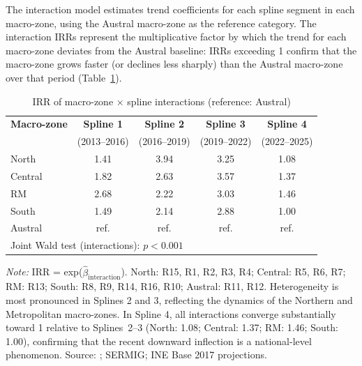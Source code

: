 \documentclass[pdflatex,sn-basic]{sn-jnl}
\newcommand{\tablenote}[1]{%
  \vspace{2pt}%
  {\par\footnotesize\textit{Note:} #1\par}%
}
\begin{document}
The interaction model estimates trend coefficients for each spline segment in each macro-zone, using the Austral macro-zone as the reference category. The interaction IRRs represent the multiplicative factor by which the trend for each macro-zone deviates from the Austral baseline: IRRs exceeding 1 confirm that the macro-zone grows faster (or declines less sharply) than the Austral macro-zone over that period (Table~\ref{tab:macro}).

\begin{table}[htbp]
\centering
\caption{IRR of macro-zone \texorpdfstring{$\times$}{x} spline interactions (reference: Austral)}
\label{tab:macro}
\small
\begin{tabular}{lcccc}
\toprule
\textbf{Macro-zone} & \textbf{Spline 1} & \textbf{Spline 2} & \textbf{Spline 3} & \textbf{Spline 4} \\
 & (2013--2016) & (2016--2019) & (2019--2022) & (2022--2025) \\
\midrule
North   & 1.41 & 3.94 & 3.25 & 1.08 \\
Central  & 1.82 & 2.63 & 3.57 & 1.37 \\
RM      & 2.68 & 2.22 & 3.03 & 1.46 \\
South     & 1.49 & 2.14 & 2.88 & 1.00 \\
Austral & ref. & ref. & ref. & ref. \\
\midrule
\multicolumn{5}{l}{Joint Wald test (interactions): $p < 0.001$} \\
\bottomrule
\end{tabular}
\tablenote{IRR = exp($\hat{\beta}_{\text{interaction}}$). North: R15, R1, R2, R3, R4; Central: R5, R6, R7; RM: R13; South: R8, R9, R14, R16, R10; Austral: R11, R12. Heterogeneity is most pronounced in Splines 2 and 3, reflecting the dynamics of the Northern and Metropolitan macro-zones. In Spline 4, all interactions converge substantially toward 1 relative to Splines~2--3 (North: 1.08; Central: 1.37; RM: 1.46; South: 1.00), confirming that the recent downward inflection is a national-level phenomenon. Source: \citet{INE2026}; SERMIG; INE Base 2017 projections.}
\end{table}

\end{document}
